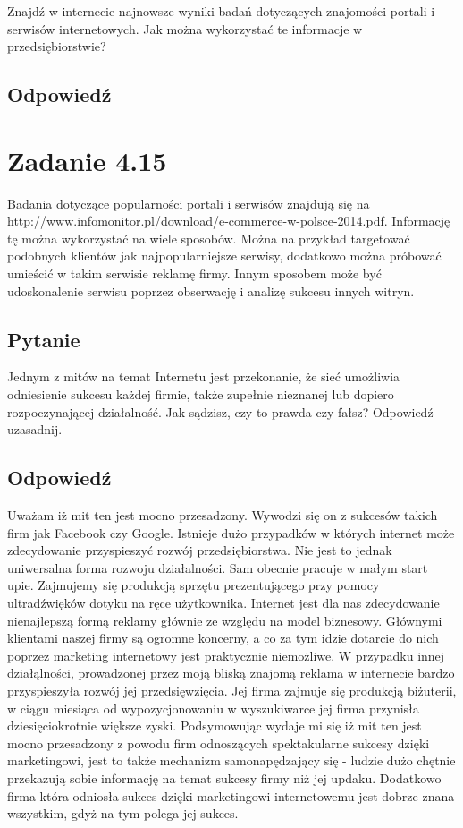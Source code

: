 \documentclass[paper=a4, fontsize=11pt]{scrartcl} %
\numberwithin{equation}{section} %
\numberwithin{figure}{section} %
\numberwithin{table}{section} %
\begin{document}
Znajdź w internecie najnowsze  wyniki badań dotyczących znajomości portali i serwisów internetowych. Jak można wykorzystać te informacje w przedsiębiorstwie?

\subsection {Odpowiedź}

\section{Zadanie 4.15}

Badania dotyczące popularności portali i serwisów znajdują się na http://www.infomonitor.pl/download/e-commerce-w-polsce-2014.pdf.
Informację tę można wykorzystać na wiele sposobów. Można na przykład targetować podobnych klientów jak najpopularniejsze serwisy,
dodatkowo można próbować umieścić w takim serwisie reklamę firmy. Innym sposobem może być udoskonalenie serwisu poprzez obserwację
i analizę sukcesu innych witryn.

\subsection {Pytanie}

Jednym z mitów na temat Internetu jest przekonanie, że sieć umożliwia odniesienie sukcesu każdej firmie, także zupełnie nieznanej lub dopiero rozpoczynającej działalność.
Jak sądzisz, czy to prawda czy fałsz? Odpowiedź uzasadnij.

\subsection {Odpowiedź}

Uważam iż mit ten jest mocno przesadzony. Wywodzi się on z sukcesów takich firm jak Facebook czy Google.
Istnieje dużo przypadków w których internet może zdecydowanie przyspieszyć rozwój przedsiębiorstwa.
Nie jest to jednak uniwersalna forma rozwoju działalności. Sam obecnie pracuje w małym start upie.
Zajmujemy się produkcją sprzętu prezentującego przy pomocy ultradźwięków dotyku na ręce użytkownika.
Internet jest dla nas zdecydowanie nienajlepszą formą reklamy głównie ze względu na model biznesowy.
Głównymi klientami naszej firmy są ogromne koncerny, a co za tym idzie dotarcie do nich poprzez marketing
internetowy jest praktycznie niemożliwe. W przypadku innej działąlności, prowadzonej przez moją bliską znajomą
reklama w internecie bardzo przyspieszyła rozwój jej przedsięwzięcia. Jej firma zajmuje się produkcją biżuterii, 
w ciągu miesiąca od wypozycjonowaniu w wyszukiwarce jej firma przynisła dziesięciokrotnie większe zyski.
Podsymowując wydaje mi się iż mit ten jest mocno przesadzony z powodu firm odnoszących spektakularne sukcesy
dzięki marketingowi, jest to także mechanizm samonapędzający się - ludzie dużo chętnie przekazują sobie informację
na temat sukcesy firmy niż jej updaku. Dodatkowo firma która odniosła sukces dzięki marketingowi internetowemu
jest dobrze znana wszystkim, gdyż na tym polega jej sukces.
\end{document}

